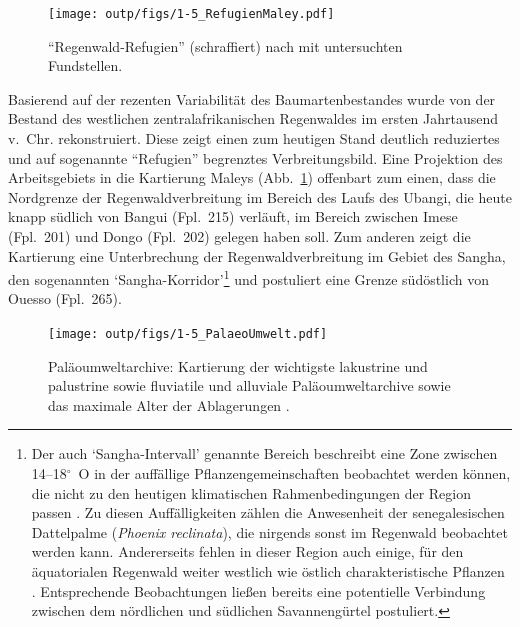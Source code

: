 \begin{figure}[p]
	\centering
	\texttt{[image: outp/figs/1-5\_RefugienMaley.pdf]}
	\caption{\enquote{Regenwald-Refugien} (schraffiert) nach \textcite[7 Abb.~4]{Maley.2001} mit untersuchten Fundstellen.}
	\label{fig:Maley2001_7Abb4}
\end{figure}

Basierend auf der rezenten Variabilität des Baumartenbestandes wurde von \textcite{Maley.2001} der Bestand des westlichen zentralafrikanischen Regenwaldes im ersten Jahrtausend v.~Chr. rekonstruiert. Diese zeigt einen zum heutigen Stand deutlich reduziertes und auf sogenannte \enquote{Refugien} begrenztes Verbreitungsbild. Eine Projektion des Arbeitsgebiets in die Kartierung Maleys (Abb.~\ref{fig:Maley2001_7Abb4}) offenbart zum einen, dass die Nordgrenze der Regenwaldverbreitung im Bereich des Laufs des Ubangi, die heute knapp südlich von Bangui (Fpl.~215) verläuft, im Bereich zwischen Imese (Fpl.~201) und Dongo (Fpl.~202) gelegen haben soll. Zum anderen zeigt die Kartierung eine Unterbrechung der Regenwaldverbreitung im Gebiet des Sangha, den sogenannten \enquote*{Sangha-Korridor}\footnote{Der auch \enquote*{Sangha-Intervall} genannte Bereich beschreibt eine Zone zwischen 14--18$^\circ$~O in der auffällige Pflanzengemeinschaften beobachtet werden können, die nicht zu den heutigen klimatischen Rahmenbedingungen der Region passen \parencite{Gond.2013}. Zu diesen Auffälligkeiten zählen die Anwesenheit der senegalesischen Dattelpalme (\textit{Phoenix reclinata}), die nirgends sonst im Regenwald beobachtet werden kann. Andererseits fehlen in dieser Region auch einige, für den äquatorialen Regenwald weiter westlich wie östlich charakteristische Pflanzen \parencite[356f.]{Bostoen.2015}. Entsprechende Beobachtungen ließen bereits \textcite{Letouzey.1968} eine potentielle Verbindung zwischen dem nördlichen und südlichen Savannengürtel postuliert.} \parencites[siehe][]{Russell.2014}{Bostoen.2015} und postuliert eine Grenze südöstlich von Ouesso (Fpl.~265).

\begin{figure}[p]
\centering
\texttt{[image: outp/figs/1-5\_PalaeoUmwelt.pdf]}
\caption{Paläoumweltarchive: Kartierung der wichtigste lakustrine und palustrine sowie fluviatile und alluviale Paläoumweltarchive sowie das maximale Alter der Ablagerungen \parencites[nach]{Brncic.2007}{Brncic.2009}{Sangen.2009}{Kiahtipes.2011}{Kiahtipes.2016}.}
\label{fig:PalaeoumweltArch_Karte}
\end{figure}

